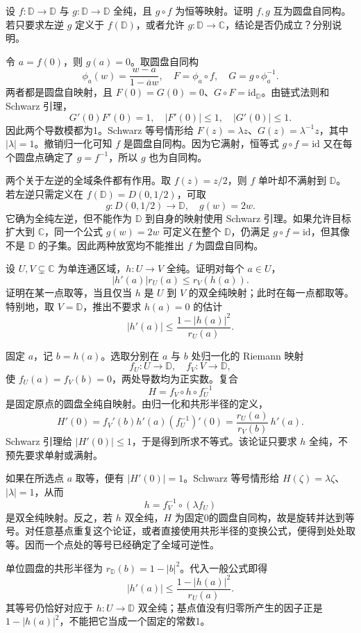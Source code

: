 \begin{exercise}\label{b3:ex:05-4}
设 \(f:\mathbb D\rightarrow\mathbb D\) 与 \(g:\mathbb D\rightarrow\mathbb D\) 全纯，且 \(g\circ f\) 为恒等映射。证明 \(f,g\) 互为圆盘自同构。若只要求左逆 \(g\) 定义于 \(f(\mathbb D)\)，或者允许 \(g:\mathbb D\rightarrow\mathbb C\)，结论是否仍成立？分别说明。
\end{exercise}
\begin{solution}
令 \(a=f(0)\)，则 \(g(a)=0\)。取圆盘自同构
\[
 \phi_a(w)=\frac{w-a}{1-\overline a w},
 \quad
 F=\phi_a\circ f,\quad G=g\circ\phi_a^{-1}.
\]
两者都是圆盘自映射，且 \(F(0)=G(0)=0\)、\(G\circ F=\mathrm{id}_{\mathbb D}\)。由链式法则和 Schwarz 引理，
\[
 G'(0)F'(0)=1,\quad |F'(0)|\le1,\quad |G'(0)|\le1.
\]
因此两个导数模都为1。Schwarz 等号情形给
\(F(z)=\lambda z\)、\(G(z)=\lambda^{-1}z\)，其中 \(|\lambda|=1\)。撤销归一化可知 \(f\) 是圆盘自同构。因为它满射，恒等式 \(g\circ f=\mathrm{id}\) 又在每个圆盘点确定了 \(g=f^{-1}\)，所以 \(g\) 也为自同构。

两个关于左逆的全域条件都有作用。取 \(f(z)=z/2\)，则 \(f\) 单叶却不满射到 \(\mathbb D\)。若左逆只需定义在 \(f(\mathbb D)=D(0,1/2)\)，可取
\[
 g:D(0,1/2)\rightarrow\mathbb D,\quad g(w)=2w.
\]
它确为全纯左逆，但不能作为 \(\mathbb D\) 到自身的映射使用 Schwarz 引理。如果允许目标扩大到 \(\mathbb C\)，同一个公式 \(g(w)=2w\) 可定义在整个 \(\mathbb D\)，仍满足 \(g\circ f=\mathrm{id}\)，但其像不是 \(\mathbb D\) 的子集。因此两种放宽均不能推出 \(f\) 为圆盘自同构。
\end{solution}

\begin{exercise}\label{b3:ex:05-5}
设 \(U,V\subsetneq\mathbb C\) 为单连通区域，\(h:U\rightarrow V\) 全纯。证明对每个 \(a\in U\)，
\[
 |h'(a)|r_U(a)\le r_V(h(a)).
\]
证明在某一点取等，当且仅当 \(h\) 是 \(U\) 到 \(V\) 的双全纯映射；此时在每一点都取等。特别地，取 \(V=\mathbb D\)，推出不要求 \(h(a)=0\) 的估计
\[
 |h'(a)|\le\frac{1-|h(a)|^2}{r_U(a)}.
\]
\end{exercise}
\begin{solution}
固定 \(a\)，记 \(b=h(a)\)。选取分别在 \(a\) 与 \(b\) 处归一化的 Riemann 映射
\[
 f_U:U\rightarrow\mathbb D,\quad
 f_V:V\rightarrow\mathbb D,
\]
使 \(f_U(a)=f_V(b)=0\)，两处导数均为正实数。复合
\[
 H=f_V\circ h\circ f_U^{-1}
\]
是固定原点的圆盘全纯自映射。由归一化和共形半径的定义，
\[
 H'(0)=f_V'(b)h'(a)(f_U^{-1})'(0)
       =\frac{r_U(a)}{r_V(b)}\,h'(a).
\]
Schwarz 引理给 \(|H'(0)|\le1\)，于是得到所求不等式。该论证只要求 \(h\) 全纯，不预先要求单射或满射。

如果在所选点 \(a\) 取等，便有 \(|H'(0)|=1\)。Schwarz 等号情形给 \(H(\zeta)=\lambda\zeta\)、\(|\lambda|=1\)，从而
\[
 h=f_V^{-1}\circ(\lambda f_U)
\]
是双全纯映射。反之，若 \(h\) 双全纯，\(H\) 为固定0的圆盘自同构，故是旋转并达到等号。对任意基点重复这个论证，或者直接使用共形半径的变换公式，便得到处处取等。因而一个点处的等号已经确定了全域可逆性。

单位圆盘的共形半径为 \(r_{\mathbb D}(b)=1-|b|^2\)。代入一般公式即得
\[
 |h'(a)|\le\frac{1-|h(a)|^2}{r_U(a)}.
\]
其等号仍恰好对应于 \(h:U\rightarrow\mathbb D\) 双全纯；基点值没有归零所产生的因子正是 \(1-|h(a)|^2\)，不能把它当成一个固定的常数1。
\end{solution}

